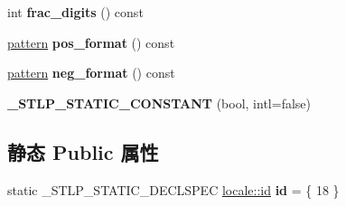 \begin{DoxyCompactItemize}
int {\bfseries frac\+\_\+digits} () const
\item 
\mbox{\label{classmoneypunct_3_01wchar__t_00_01false_01_4_a939587183604ac45b9ecb73631c231ef}} 
\hyperlink{structmoney__base_1_1pattern}{pattern} {\bfseries pos\+\_\+format} () const
\item 
\mbox{\label{classmoneypunct_3_01wchar__t_00_01false_01_4_ae53de6a190034b65e19f5b21fc6407e7}} 
\hyperlink{structmoney__base_1_1pattern}{pattern} {\bfseries neg\+\_\+format} () const
\item 
\mbox{\label{classmoneypunct_3_01wchar__t_00_01false_01_4_af30df8f14a658dac7c14bad4386efff1}} 
{\bfseries \+\_\+\+S\+T\+L\+P\+\_\+\+S\+T\+A\+T\+I\+C\+\_\+\+C\+O\+N\+S\+T\+A\+NT} (bool, intl=false)
\end{DoxyCompactItemize}
\subsection*{静态 Public 属性}
\begin{DoxyCompactItemize}
\item 
\mbox{\label{classmoneypunct_3_01wchar__t_00_01false_01_4_a72ffadc65d3e6a745fd4b73c29615ba7}} 
static \+\_\+\+S\+T\+L\+P\+\_\+\+S\+T\+A\+T\+I\+C\+\_\+\+D\+E\+C\+L\+S\+P\+EC \hyperlink{classlocale_1_1id}{locale\+::id} {\bfseries id} = \{ 18 \}
\end{DoxyCompactItemize}
